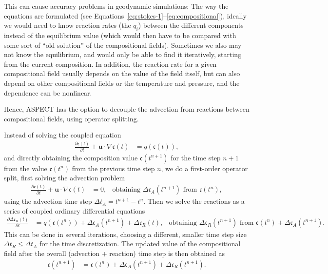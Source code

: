 \documentclass{article}
\newcommand{\aspect}{\textsc{ASPECT}}
\begin{document}
This can cause accuracy problems in geodynamic simulations: The way the equations are formulated (see Equations~\ref{eq:stokes-1}--\ref{eq:compositional}), ideally we would need to know reaction rates (the $q_i$) between the different components instead of the equilibrium value (which would then have to be compared with some sort of ``old solution'' of the compositional fields). Sometimes we also may not know the equilibrium, and would only be able to find it iteratively, starting from the current composition. In addition, the reaction rate for a given compositional field usually depends on the value of the field itself, but can also depend on other compositional fields or the temperature and pressure, and the dependence can be nonlinear.

Hence, \aspect{} has the option to decouple the advection from reactions between compositional fields, using operator splitting.

Instead of solving the coupled equation
\begin{align}
  \frac{\partial \mathfrak{c}(t)}{\partial t} + \mathbf u\cdot\nabla \mathfrak{c}(t)
  &=
  q(\mathfrak{c}(t)),
\end{align}
and directly obtaining the composition value $\mathfrak{c}(t^{n+1})$ for the time step $n+1$ from the value $\mathfrak{c}(t^{n})$ from the previous time step $n$, we do a first-order operator split, first solving the advection problem
\begin{align}
  \frac{\partial \mathfrak{c}(t)}{\partial t} + \mathbf u\cdot\nabla \mathfrak{c}(t)
  &=
  0,
  &
  \text{obtaining } \Delta \mathfrak{c}_A(t^{n+1}) \text{ from } \mathfrak{c}(t^{n}),
\end{align}
using the advection time step $\Delta t_A = t^{n+1} - t^{n}$.
Then we solve the reactions as a series of coupled ordinary differential equations 
\begin{align}
  \frac{\partial \Delta \mathfrak{c}_R(t)}{\partial t} 
  &=
  q(\mathfrak{c}(t^n))+\Delta \mathfrak{c}_A(t^{n+1})+\Delta \mathfrak{c}_R(t),
  &
  \text{obtaining } \Delta \mathfrak{c}_R(t^{n+1}) \text{ from } \mathfrak{c}(t^n)+\Delta \mathfrak{c}_A(t^{n+1}).
\end{align}
This can be done in several iterations, choosing a different, smaller time step size $\Delta t_R \leq \Delta t_A$ for the time discretization. 
The updated value of the compositional field after the overall (advection + reaction) time step is then obtained as
\begin{align}
  \mathfrak{c}(t^{n+1}) 
  &=
  \mathfrak{c}(t^{n}) + \Delta \mathfrak{c}_A(t^{n+1})+\Delta \mathfrak{c}_R(t^{n+1}).
\end{align}
\end{document}
